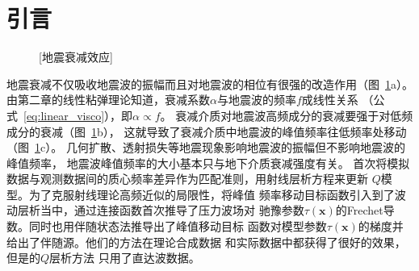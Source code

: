 \section{引言}
\begin{figure}[!htbp]
    \centering
    [地震衰减效应]
    \label{fig:q_effect}
\end{figure}
地震衰减不仅吸收地震波的振幅而且对地震波的相位有很强的改造作用（图~\ref{fig:q_effect}a）。
由第二章的线性粘弹理论知道，衰减系数$\alpha$与地震波的频率$f$成线性关系
（公式~\ref{eq:linear_visco}），即$\alpha\propto f$。
衰减介质对地震波高频成分的衰减要强于对低频成分的衰减（图~\ref{fig:q_effect}b），
这就导致了衰减介质中地震波的峰值频率往低频率处移动（图~\ref{fig:q_effect}c）。
几何扩散、透射损失等地震现象影响地震波的振幅但不影响地震波的峰值频率，
地震波峰值频率的大小基本只与地下介质衰减强度有关。
首次将模拟数据与观测数据间的质心频率差异作为匹配准则，用射线层析方程来更新
$Q$模型。为了克服射线理论高频近似的局限性，将峰值
频率移动目标函数引入到了波动层析当中，通过连接函数首次推导了压力波场对
驰豫参数$\tau(\mathbf{x})$的Frechet导数。同时也用伴随状态法推导出了峰值移动目标
函数对模型参数$\tau(\mathbf{x})$的梯度并给出了伴随源。他们的方法在理论合成数据
和实际数据中都获得了很好的效果，但是的$Q$层析方法
只用了直达波数据。

